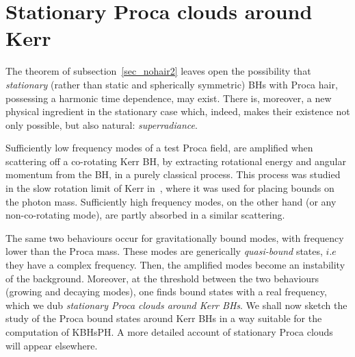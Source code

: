 

 


\section{Stationary Proca clouds around Kerr}
\label{sec_clouds}
The theorem of subsection~\ref{sec_nohair2} leaves open the possibility that \textit{stationary} (rather than static and spherically symmetric) BHs with Proca hair, possessing a harmonic time dependence, may exist. There is, moreover, a new physical ingredient in the stationary case which, indeed, makes their existence not only possible, but also natural: \textit{superradiance}. 

Sufficiently low frequency modes of a test Proca field, are amplified when scattering off a co-rotating Kerr BH, by extracting rotational energy and angular momentum from the BH, in a purely classical process. This process was studied in the slow rotation limit of Kerr in~\cite{Pani:2012vp,Pani:2012bp}, where it was used for placing bounds on the photon mass. Sufficiently high frequency modes, on the other hand (or any non-co-rotating mode), are partly absorbed in a similar scattering. 

The same two behaviours occur for gravitationally bound modes, with frequency lower than the Proca mass. These modes are generically \textit{quasi-bound} states, $i.e$ they have a complex frequency. Then, the amplified modes become an instability of the background. Moreover, at the threshold between the two behaviours (growing and decaying modes), one finds bound states with a real frequency, which we dub \textit{stationary Proca clouds around Kerr BHs}. We shall now sketch the study of the Proca bound states around Kerr BHs in a way suitable for the computation of KBHsPH. A more detailed account of stationary Proca clouds will appear elsewhere. 

